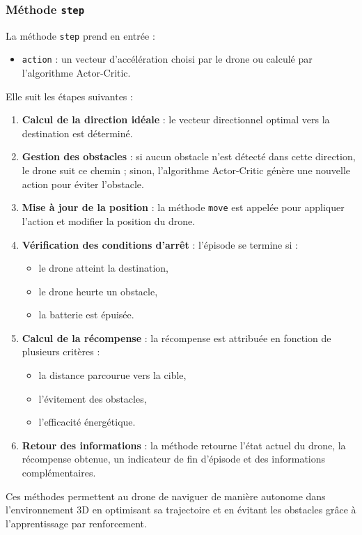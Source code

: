 \documentclass[a4paper, 12pt]{article}
\begin{document}
\subsubsection{Méthode \texttt{step}}

La méthode \texttt{step} prend en entrée :
\begin{itemize}
    \item \texttt{action} : un vecteur d’accélération choisi par le drone ou calculé par l’algorithme Actor-Critic.
\end{itemize}

Elle suit les étapes suivantes :
\begin{enumerate}
    \item \textbf{Calcul de la direction idéale} : le vecteur directionnel optimal vers la destination est déterminé.
    \item \textbf{Gestion des obstacles} : si aucun obstacle n’est détecté dans cette direction, le drone suit ce chemin ; sinon, l’algorithme Actor-Critic génère une nouvelle action pour éviter l’obstacle.
    \item \textbf{Mise à jour de la position} : la méthode \texttt{move} est appelée pour appliquer l’action et modifier la position du drone.
    \item \textbf{Vérification des conditions d’arrêt} : l’épisode se termine si :
    \begin{itemize}
        \item le drone atteint la destination,
        \item le drone heurte un obstacle,
        \item la batterie est épuisée.
    \end{itemize}
    \item \textbf{Calcul de la récompense} : la récompense est attribuée en fonction de plusieurs critères :
    \begin{itemize}
        \item la distance parcourue vers la cible,
        \item l’évitement des obstacles,
        \item l’efficacité énergétique.
    \end{itemize}
    \item \textbf{Retour des informations} : la méthode retourne l’état actuel du drone, la récompense obtenue, un indicateur de fin d’épisode et des informations complémentaires.
\end{enumerate}

Ces méthodes permettent au drone de naviguer de manière autonome dans l’environnement 3D en optimisant sa trajectoire et en évitant les obstacles grâce à l’apprentissage par renforcement.
\end{document}
